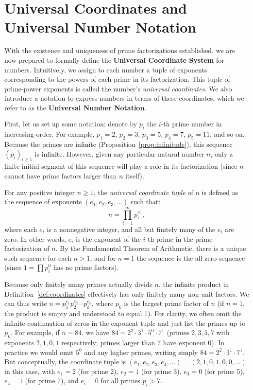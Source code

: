 \documentclass[11pt]{article}
\begin{document}
\section{Universal Coordinates and Universal Number Notation}

With the existence and uniqueness of prime factorizations established, we are now prepared to formally define the \textbf{Universal Coordinate System} for numbers. Intuitively, we assign to each number a tuple of exponents corresponding to the powers of each prime in its factorization. This tuple of prime-power exponents is called the number's \emph{universal coordinates}. We also introduce a notation to express numbers in terms of these coordinates, which we refer to as the \textbf{Universal Number Notation}.

First, let us set up some notation: denote by $p_i$ the $i$-th prime number in increasing order. For example, $p_1 = 2$, $p_2 = 3$, $p_3 = 5$, $p_4 = 7$, $p_5 = 11$, and so on. Because the primes are infinite (Proposition~\ref{prop:infinitude}), this sequence $(p_i)_{i\ge 1}$ is infinite. However, given any particular natural number $n$, only a finite initial segment of this sequence will play a role in its factorization (since $n$ cannot have prime factors larger than $n$ itself). 

\begin{definition}\label{def:coordinates}
For any positive integer $n \ge 1$, the \emph{universal coordinate tuple} of $n$ is defined as the sequence of exponents $(e_1, e_2, e_3, \dots)$ such that:
\[ n = \prod_{i=1}^{\infty} p_i^{\,e_i}, \] 
where each $e_i$ is a nonnegative integer, and all but finitely many of the $e_i$ are zero. In other words, $e_i$ is the exponent of the $i$-th prime in the prime factorization of $n$. By the Fundamental Theorem of Arithmetic, there is a unique such sequence for each $n>1$, and for $n=1$ the sequence is the all-zero sequence (since $1 = \prod p_i^0$ has no prime factors).
\end{definition}

Because only finitely many primes actually divide $n$, the infinite product in Definition~\ref{def:coordinates} effectively has only finitely many non-unit factors. We can thus write $n = p_1^{e_1} p_2^{e_2} \cdots p_k^{e_k}$, where $p_k$ is the largest prime factor of $n$ (if $n=1$, the product is empty and understood to equal 1). For clarity, we often omit the infinite continuation of zeros in the exponent tuple and just list the primes up to $p_k$. For example, if $n = 84$, we have $84 = 2^2 \cdot 3^1 \cdot 5^0 \cdot 7^1$ (primes $2,3,5,7$ with exponents $2,1,0,1$ respectively; primes larger than 7 have exponent 0). In practice we would omit $5^0$ and any higher primes, writing simply $84 = 2^2 \cdot 3^1 \cdot 7^1$. But conceptually, the coordinate tuple is $(e_1,e_2,e_3,e_4,\ldots) = (2,1,0,1,0,0,\ldots)$ in this case, with $e_1=2$ (for prime 2), $e_2=1$ (for prime 3), $e_3=0$ (for prime 5), $e_4=1$ (for prime 7), and $e_i=0$ for all primes $p_i > 7$.
\end{document}
